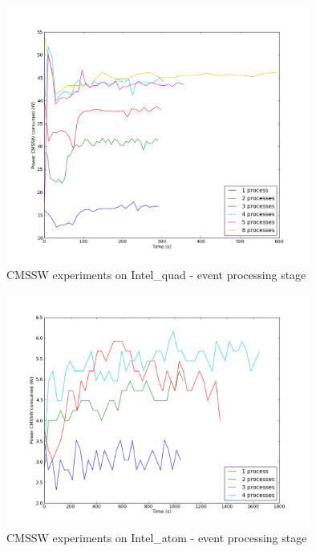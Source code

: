 \begin{figure}[h]
  \centering
    \includegraphics[width=100mm]{"img/aalto/aalto_quadEvents"}
    \caption{CMSSW experiments on Intel\_quad - event processing stage}
    \label{fig:aalto_quad_events}
\end{figure}

\begin{figure}[h]
  \centering
    \includegraphics[width=100mm]{"img/aalto/aalto_atomEvents"}
    \caption{CMSSW experiments on Intel\_atom - event processing stage}
    \label{fig:aalto_atom_events}
\end{figure}

